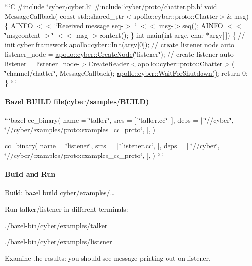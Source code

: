 ```\-C \#include \char`\"{}cyber/cyber.\-h\char`\"{} \#include \char`\"{}cyber/proto/chatter.\-pb.\-h\char`\"{} void Message\-Callback( const std\-::shared\-\_\-ptr$<$apollo\-::cyber\-::proto\-::\-Chatter$>$\& msg) \{ A\-I\-N\-F\-O $<$$<$ \char`\"{}\-Received message seq-\/$>$ \char`\"{} $<$$<$ msg-\/$>$seq(); A\-I\-N\-F\-O $<$$<$ \char`\"{}msgcontent-\/$>$\char`\"{} $<$$<$ msg-\/$>$content(); \} int main(int argc, char $\ast$argv\mbox{[}$\,$\mbox{]}) \{ // init cyber framework apollo\-::cyber\-::\-Init(argv\mbox{[}0\mbox{]}); // create listener node auto listener\-\_\-node = \hyperlink{namespaceapollo_1_1cyber_ae369c5de0279f2a5745d0438d532bc89}{apollo\-::cyber\-::\-Create\-Node}(\char`\"{}listener\char`\"{}); // create listener auto listener = listener\-\_\-node-\/$>$Create\-Reader$<$apollo\-::cyber\-::proto\-::\-Chatter$>$( \char`\"{}channel/chatter\char`\"{}, Message\-Callback); \hyperlink{namespaceapollo_1_1cyber_a7929114e78a9c595b0ee715968ca2712}{apollo\-::cyber\-::\-Wait\-For\-Shutdown()}; return 0; \} ``` \paragraph*{Bazel B\-U\-I\-L\-D file(cyber/samples/\-B\-U\-I\-L\-D)}

```bazel cc\-\_\-binary( name = \char`\"{}talker\char`\"{}, srcs = \mbox{[} \char`\"{}talker.\-cc\char`\"{}, \mbox{]}, deps = \mbox{[} \char`\"{}//cyber\char`\"{}, \char`\"{}//cyber/examples/proto\-:examples\-\_\-cc\-\_\-proto\char`\"{}, \mbox{]}, )

cc\-\_\-binary( name = \char`\"{}listener\char`\"{}, srcs = \mbox{[} \char`\"{}listener.\-cc\char`\"{}, \mbox{]}, deps = \mbox{[} \char`\"{}//cyber\char`\"{}, \char`\"{}//cyber/examples/proto\-:examples\-\_\-cc\-\_\-proto\char`\"{}, \mbox{]}, ) ``` \paragraph*{Build and Run}


\begin{DoxyItemize}
\item Build\-: bazel build cyber/examples/…
\item Run talker/listener in different terminals\-:
\begin{DoxyItemize}
\item ./bazel-\/bin/cyber/examples/talker
\item ./bazel-\/bin/cyber/examples/listener
\end{DoxyItemize}
\item Examine the results\-: you should see message printing out on listener.
\end{DoxyItemize}

